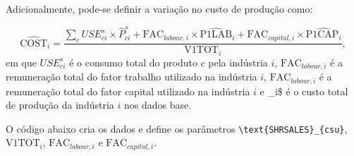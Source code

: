 \documentclass[12pt,twoside]{article}
\begin{document}
Adicionalmente, pode-se definir a variação no custo de produção como:

\[\hat{\text{COST}}_i = \frac{\sum_c USE_{ci}^s \times \hat{P}^s_{ci} + \text{FAC}_{labour,i} \times \hat{\text{P1LAB}}_i + \text{FAC}_{capital,i} \times \hat{\text{P1CAP}_i}}{\text{V1TOT}_i},\]
em que \(USE_{ci}^s\) é o consumo total do produto \(c\) pela indústria
\(i\), \(\text{FAC}_{labour,i}\) é a remuneração total do fator trabalho
utilizado na indústria \(i\), \(\text{FAC}_{labour,i}\) é a remuneração
total do fator capital utilizado na indústria \(i\) e \_i\$
é o custo total de produção da indústria \(i\) nos dados base.

O código abaixo cria os dados e define os parâmetros
\texttt{\textbackslash{}text\{SHRSALES\}\_\{csu\}}, \(\text{V1TOT}_i\),
\(\text{FAC}_{labour,i}\) e \(\text{FAC}_{capital,i}\).
\end{document}
